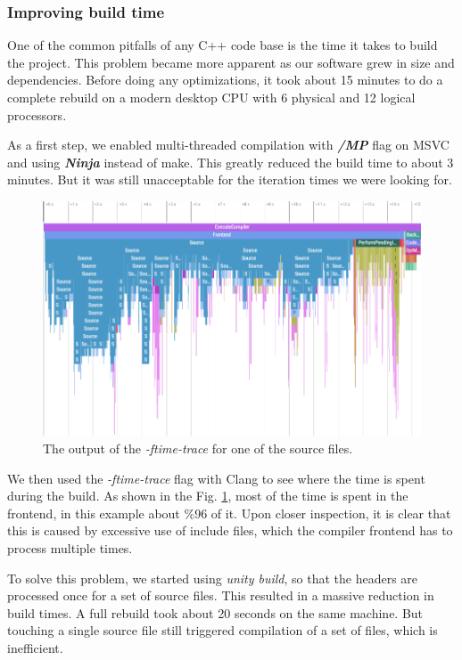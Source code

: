 \documentclass[runningheads]{llncs}
\begin{document}
\subsubsection{Improving build time}
One of the common pitfalls of any C++ code base is the time it takes to build the project. This problem became more apparent as our software grew in size and dependencies. Before doing any optimizations, it took about 15 minutes to do a complete rebuild on a modern desktop CPU with 6 physical and 12 logical processors.

As a first step, we enabled multi-threaded compilation with \textbf{\textit{/MP}} flag on MSVC and using \textbf{\textit{Ninja}} \cite{ref_ninja} instead of make. This greatly reduced the build time to about 3 minutes. But it was still unacceptable for the iteration times we were looking for.

\begin{figure}
	\centering
	\includegraphics[width=\textwidth]{images/time-trace.png}
	\caption{The output of the \textit{-ftime-trace} for one of the source files.}
	\label{fig:time-trace}
\end{figure}

We then used the \textit{-ftime-trace} flag with Clang to see where the time is spent during the build. As shown in the Fig. \ref{fig:time-trace}, most of the time is spent in the frontend, in this example about \%96 of it. Upon closer inspection, it is clear that this is caused by excessive use of include files, which the compiler frontend has to process multiple times.

To solve this problem, we started using \textit{unity build}, so that the headers are processed once for a set of source files. This resulted in a massive reduction in build times. A full rebuild took about 20 seconds on the same machine. But touching a single source file still triggered compilation of a set of files, which is inefficient.
\end{document}

